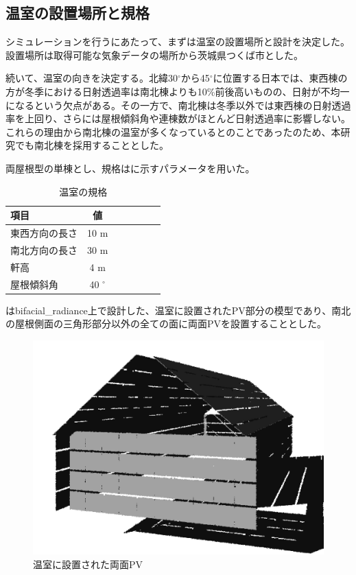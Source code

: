 \documentclass[uplatex,dvipdfmx,nomag,a4paper,oneside,onecolumn,12pt]{bxjsreport} %
\begin{document}
\subsection{温室の設置場所と規格}
シミュレーションを行うにあたって、まずは温室の設置場所と設計を決定した。設置場所は取得可能な気象データの場所から茨城県つくば市とした。

続いて、温室の向きを決定する。北緯30\(^\circ\)から45\(^\circ\)に位置する日本では、東西棟の方が冬季における日射透過率は南北棟よりも10\%前後高いものの、日射が不均一になるという欠点がある。その一方で、南北棟は冬季以外では東西棟の日射透過率を上回り、さらには屋根傾斜角や連棟数がほとんど日射透過率に影響しない。これらの理由から南北棟の温室が多くなっている\cite{Samejima2021}とのことであったのため、本研究でも南北棟を採用することとした。

両屋根型の単棟とし、規格はに示すパラメータを用いた。

\begin{table}[ht]
    \caption{温室の規格}
    \label{tab:housedesign}
    \centering
    \begin{tabular}{lcrrrrc}
        \toprule %
        項目 & 値\\
        \midrule %
        東西方向の長さ & 10 m\\
        南北方向の長さ & 30 m\\
        軒高 & 4 m\\
        屋根傾斜角 & 40 \(^\circ\)\\
        \bottomrule %
    \end{tabular}
\end{table}


はbifacial\_radiance上で設計した、温室に設置されたPV部分の模型であり、南北の屋根側面の三角形部分以外の全ての面に両面PVを設置することとした。

\begin{figure}[ht]
    \centering
    \includegraphics[width=0.7\linewidth]{fig/PVmodel.png}
    \caption{温室に設置された両面PV}
    \label{fig:bifacialPV}
\end{figure}
\end{document}
